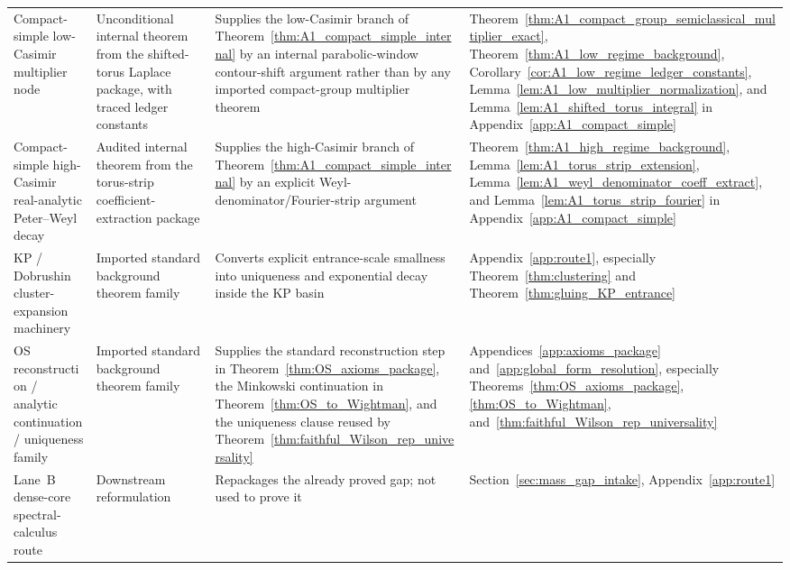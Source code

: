 \begin{longtable}{@{}
>{\RaggedRight\arraybackslash}p{}
>{\RaggedRight\arraybackslash}p{}
>{\RaggedRight\arraybackslash}p{}
>{\RaggedRight\arraybackslash}p{}@{}}
Compact-simple low-Casimir multiplier node & Unconditional internal theorem from the shifted-torus Laplace package, with traced ledger constants & Supplies the low-Casimir branch of Theorem~\ref{thm:A1_compact_simple_internal} by an internal parabolic-window contour-shift argument rather than by any imported compact-group multiplier theorem & Theorem~\ref{thm:A1_compact_group_semiclassical_multiplier_exact}, Theorem~\ref{thm:A1_low_regime_background}, Corollary~\ref{cor:A1_low_regime_ledger_constants}, Lemma~\ref{lem:A1_low_multiplier_normalization}, and Lemma~\ref{lem:A1_shifted_torus_integral} in Appendix~\ref{app:A1_compact_simple}\\[0.35em]

Compact-simple high-Casimir real-analytic Peter--Weyl decay & Audited internal theorem from the torus-strip coefficient-extraction package & Supplies the high-Casimir branch of Theorem~\ref{thm:A1_compact_simple_internal} by an explicit Weyl-denominator/Fourier-strip argument & Theorem~\ref{thm:A1_high_regime_background}, Lemma~\ref{lem:A1_torus_strip_extension}, Lemma~\ref{lem:A1_weyl_denominator_coeff_extract}, and Lemma~\ref{lem:A1_torus_strip_fourier} in Appendix~\ref{app:A1_compact_simple}\\[0.35em]

KP / Dobrushin cluster-expansion machinery & Imported standard background theorem family & Converts explicit entrance-scale smallness into uniqueness and exponential decay inside the KP basin & Appendix~\ref{app:route1}, especially Theorem~\ref{thm:clustering} and Theorem~\ref{thm:gluing_KP_entrance}\\[0.35em]

OS reconstruction / analytic continuation / uniqueness family & Imported standard background theorem family & Supplies the standard reconstruction step in Theorem~\ref{thm:OS_axioms_package}, the Minkowski continuation in Theorem~\ref{thm:OS_to_Wightman}, and the uniqueness clause reused by Theorem~\ref{thm:faithful_Wilson_rep_universality} & Appendices~\ref{app:axioms_package} and~\ref{app:global_form_resolution}, especially Theorems~\ref{thm:OS_axioms_package}, \ref{thm:OS_to_Wightman}, and~\ref{thm:faithful_Wilson_rep_universality}\\[0.35em]

Lane~B dense-core spectral-calculus route & Downstream reformulation & Repackages the already proved gap; not used to prove it & Section~\ref{sec:mass_gap_intake}, Appendix~\ref{app:route1}\\[0.35em]


\end{longtable}

